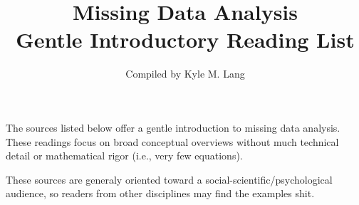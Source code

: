 \documentclass[12pt]{article}
\title{Missing Data Analysis\\ \Large Gentle Introductory Reading List}
\author{Compiled by Kyle M. Lang}
\begin{document}
\maketitle

The sources listed below offer a gentle introduction to missing data analysis.
These readings focus on broad conceptual overviews without much technical detail
or mathematical rigor (i.e., very few equations).

These sources are generaly oriented toward a social-scientific/psychological
audience, so readers from other disciplines may find the examples shit.





\end{document}
